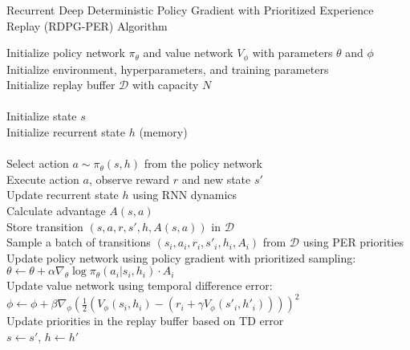 \documentclass[preprint,12pt]{elsarticle}
\begin{document}
\begin{algorithm}[!htbp]
\caption{Recurrent Deep Deterministic Policy Gradient with Prioritized Experience Replay (RDPG-PER) Algorithm}
\begin{algorithmic}
    \STATE Initialize policy network $\pi_{\theta}$ and value network $V_{\phi}$ with parameters $\theta$ and $\phi$\\
    \STATE Initialize environment, hyperparameters, and training parameters\\
    \STATE Initialize replay buffer $\mathcal{D}$ with capacity $N$\\
    \\
        \STATE Initialize state $s$\\
        \STATE Initialize recurrent state $h$ (memory)\\
        \\
            \STATE Select action $a \sim \pi_{\theta}(s, h)$ from the policy network\\
            \STATE Execute action $a$, observe reward $r$ and new state $s'$\\
            \STATE Update recurrent state $h$ using RNN dynamics\\
            \STATE Calculate advantage $A(s, a)$\\
            \STATE Store transition $(s, a, r, s', h, A(s, a))$ in $\mathcal{D}$\\
            \STATE Sample a batch of transitions $(s_i, a_i, r_i, s'_i, h_i, A_i)$ from $\mathcal{D}$ using PER priorities\\
            \STATE Update policy network using policy gradient with prioritized sampling:\\
            \STATE \quad $\theta \leftarrow \theta + \alpha \nabla_\theta \log \pi_{\theta}(a_i|s_i, h_i) \cdot A_i$\\
            \STATE Update value network using temporal difference error:\\
            \STATE \quad $\phi \leftarrow \phi + \beta \nabla_\phi \left(\frac{1}{2}(V_\phi(s_i, h_i) - (r_i + \gamma V_\phi(s'_i, h'_i))) \right)^2$\\
            \STATE Update priorities in the replay buffer based on TD error\\
            \STATE $s \leftarrow s'$, $h \leftarrow h'$\\
        \ENDFOR\\
    \ENDFOR\\
\end{algorithmic}
\end{algorithm}\\
\end{document}
